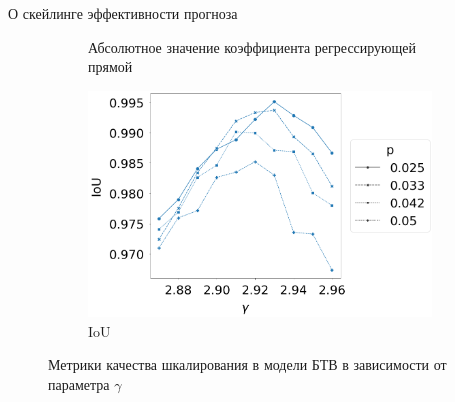 \documentclass{beamer}
\begin{document}
\begin{frame}{О скейлинге эффективности прогноза}
\begin{onlyenv}
\begin{figure}[h]
\begin{subfigure}[t]{0.27\textwidth}
					\caption{Абсолютное значение коэффициента регрессирующей прямой}
				\end{subfigure}
				\hspace{0mm}
				\begin{subfigure}[t]{0.27\textwidth}
					\centering
					\includegraphics[height=\textwidth]{images/IoU_btw}
					\caption{IoU}
				\end{subfigure}
				\caption*{Метрики качества шкалирования в модели БТВ в зависимости от параметра $\gamma$}\label{pic:btw_scaling_metrics}
			\end{figure}
		\end{onlyenv}
		

\end{frame}
\end{document}
